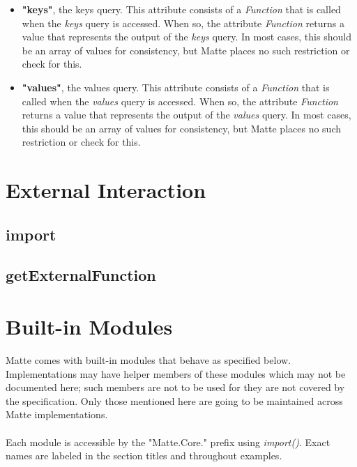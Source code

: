 \documentclass[12pt,letterpaper]{report}
\begin{document}
\begin{itemize}


  \item \textbf{"keys"}, the keys query. This attribute consists of a \textit{Function} that 
  is called when the \textit{keys} query is accessed. When so, the attribute \textit{Function}
  returns a value that represents the output of the \textit{keys} query. In most cases, this 
  should be an array of values for consistency, but Matte places no such restriction or check 
  for this.
  


  \item \textbf{"values"}, the values query. This attribute consists of a \textit{Function} that 
  is called when the \textit{values} query is accessed. When so, the attribute \textit{Function}
  returns a value that represents the output of the \textit{values} query. In most cases, this 
  should be an array of values for consistency, but Matte places no such restriction or check 
  for this.
  


\end{itemize}


\chapter{External Interaction}\label{External Interaction}
\section{import}\label{import}
\section{getExternalFunction}\label{getExternalFunction}
\chapter{Built-in Modules}\label{Built-in Modules}

Matte comes with built-in modules that behave as specified below. Implementations 
may have helper members of these modules which may not be documented here; such 
members are not to be used for they are not covered by the specification.
Only those mentioned here are going to be maintained across Matte implementations.
\\\\
Each module is accessible by the "Matte.Core." prefix using \textit{import()}. Exact
names are labeled in the section titles and throughout examples.
\end{document}
